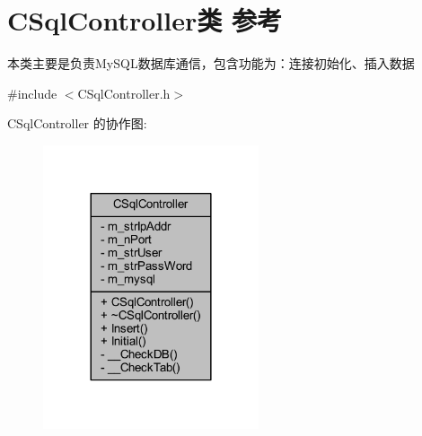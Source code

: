 \hypertarget{class_c_sql_controller}{}\section{C\+Sql\+Controller类 参考}
\label{class_c_sql_controller}


本类主要是负责\+My\+S\+Q\+L数据库通信，包含功能为：连接初始化、插入数据  




{\ttfamily \#include $<$C\+Sql\+Controller.\+h$>$}



C\+Sql\+Controller 的协作图\+:\nopagebreak
\begin{figure}[H]
\begin{center}
\leavevmode
\includegraphics[width=180pt]{class_c_sql_controller__coll__graph}
\end{center}
\end{figure}
